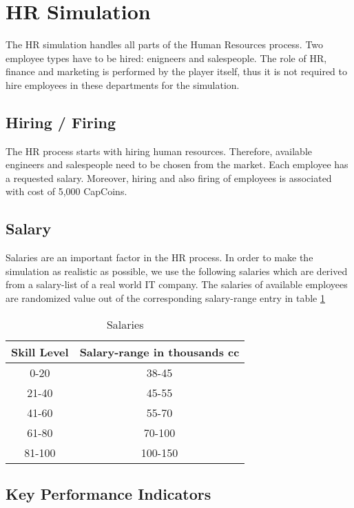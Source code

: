 \section{HR Simulation}
\label{sec:HRsim}
The HR simulation handles all parts of the Human Resources process. Two employee types have to be hired: enigneers and salespeople. The role of HR, finance and marketing is performed by the player itself, thus it is not required to hire employees in these departments for the simulation. 

\subsection{Hiring / Firing}
The HR process starts with hiring human resources. Therefore, available engineers and salespeople need to be chosen from the market. Each employee has a requested salary. Moreover, hiring and also firing of employees is associated with cost of 5,000 CapCoins. \cite{recruiterbox}

\subsection{Salary}
Salaries are an important factor in the HR process. In order to make the simulation as realistic as possible, we use the following salaries which are derived from a salary-list of a real world IT company. The salaries of available employees are randomized value out of the corresponding salary-range entry in table \ref{tab:Salaries}


\begin{table}[H]
    \centering
\begin{tabular}{c|c}
    \hline
     \textbf{Skill Level} & \textbf{Salary-range in thousands cc} \\
     \hline \hline
     0-20 & 38-45  \\
     21-40 & 45-55 \\
     41-60 & 55-70  \\
     61-80 & 70-100  \\
     81-100 & 100-150  \\
     \hline

\end{tabular}
\caption{Salaries}
    \label{tab:Salaries}
\end{table}

\subsection{Key Performance Indicators}
\label{sub:KPI}
